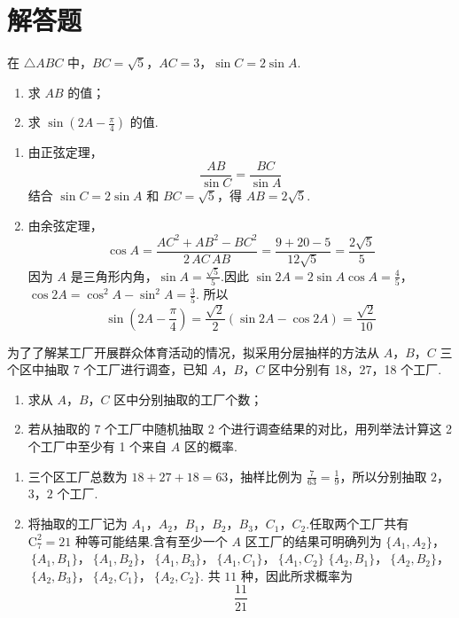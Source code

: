 \section{解答题}

\begin{problem}
在 \(\triangle ABC\) 中，\(BC = \sqrt{5}\)，\(AC = 3\)，\(\sin C = 2\sin A\).
\begin{enumerate}
\item 求 \(AB\) 的值；
\item 求 \( \sin\left(2A-\frac{\pi}{4}\right) \) 的值.
\end{enumerate}
\end{problem}

\begin{solution}
\begin{enumerate}
\item 由正弦定理，
\[
\frac{AB}{\sin C}=\frac{BC}{\sin A}
\]
结合 \(\sin C=2\sin A\) 和 \(BC=\sqrt5\)，得 \(AB=2\sqrt5\).

\item 由余弦定理，
\[
\cos A=\frac{AC^2+AB^2-BC^2}{2\,AC\,AB}=\frac{9+20-5}{12\sqrt5}=\frac{2\sqrt5}{5}
\]
因为 \(A\) 是三角形内角，\(\sin A=\frac{\sqrt5}{5}\).因此
\(\sin2A=2\sin A\cos A=\frac45\)，\(\cos2A=\cos^2A-\sin^2A=\frac35\).
所以
\[
\sin\left(2A-\frac\pi4\right)=\frac{\sqrt2}{2}(\sin2A-\cos2A)=\frac{\sqrt2}{10}
\]
\end{enumerate}
\end{solution}

\begin{problem}
为了了解某工厂开展群众体育活动的情况，拟采用分层抽样的方法从 \(A\)，\(B\)，\(C\) 三个区中抽取 7 个工厂进行调查，已知 \(A\)，\(B\)，\(C\) 区中分别有 18，27，18 个工厂.
\begin{enumerate}
\item 求从 \(A\)，\(B\)，\(C\) 区中分别抽取的工厂个数；
\item 若从抽取的 7 个工厂中随机抽取 2 个进行调查结果的对比，用列举法计算这 2 个工厂中至少有 1 个来自 \(A\) 区的概率.
\end{enumerate}
\end{problem}

\begin{solution}
\begin{enumerate}
\item 三个区工厂总数为 \(18+27+18=63\)，抽样比例为 \(\frac{7}{63}=\frac{1}{9}\)，所以分别抽取 \(2\)，\(3\)，\(2\) 个工厂.

\item 将抽取的工厂记为 \(A_1\)，\(A_2\)，\(B_1\)，\(B_2\)，\(B_3\)，\(C_1\)，\(C_2\).任取两个工厂共有 \(\mathrm C_7^2=21\) 种等可能结果.含有至少一个 \(A\) 区工厂的结果可明确列为
\(\{A_1,A_2\}\)，\(\ \{A_1,B_1\}\)，\(\ \{A_1,B_2\}\)，\(\ \{A_1,B_3\}\)，\(\ \{A_1,C_1\}\)，\(\ \{A_1,C_2\}\)
\(\{A_2,B_1\}\)，\(\ \{A_2,B_2\}\)，\(\ \{A_2,B_3\}\)，\(\ \{A_2,C_1\}\)，\(\ \{A_2,C_2\}\).
共 \(11\) 种，因此所求概率为
\[
\frac{11}{21}
\]
\end{enumerate}
\end{solution}

